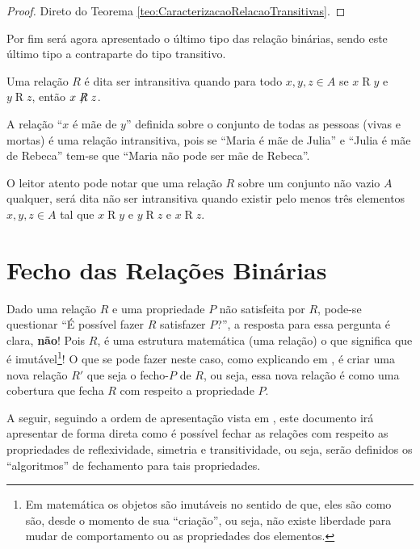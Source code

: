 \begin{proof}
	Direto do Teorema \ref{teo:CaracterizacaoRelacaoTransitivas}.
\end{proof}

Por fim será agora apresentado o último tipo das relação binárias, sendo este último tipo a contraparte do tipo transitivo.

\begin{definicao}\label{def::RelacaoIntransitiva}
	Uma relação $R$ é dita ser intransitiva quando para todo $x, y, z \in A$ se $x \mathrel{R} y$ e $y \mathrel{R} z$, então $x \centernot{R} z$.
\end{definicao}

\begin{exemplo}
	A relação ``$x$ é mãe de $y$'' definida sobre o conjunto de todas as pessoas (vivas e mortas) é uma relação intransitiva, pois se ``Maria é mãe de Julia'' e ``Julia é mãe de Rebeca'' tem-se que ``Maria não pode ser mãe de Rebeca''.
\end{exemplo}

O leitor atento pode notar que uma relação $R$ sobre um conjunto não vazio $A$ qualquer, será dita não ser intransitiva quando existir pelo menos três elementos $x, y, z \in A$ tal que $x \mathrel{R} y$ e $y \mathrel{R} z$ e $x \mathrel{R} z$.

\section{Fecho das Relações Binárias}\label{sec:FechoDasRelacoesBinarias}

Dado uma relação $R$ e uma propriedade $P$ não satisfeita por $R$,  pode-se questionar ``É possível fazer $R$ satisfazer  $P$?'', a resposta para essa pergunta é clara, \textbf{não}! Pois $R$, é uma estrutura matemática (uma relação) o que significa que é imutável\footnote{Em matemática os objetos são imutáveis no sentido de que, eles são como são, desde o momento de sua ``criação'', ou seja, não existe liberdade para mudar de comportamento ou as propriedades dos elementos.}! O que se pode fazer neste caso, como explicando em \cite{judith2021}, é criar uma nova relação $R'$ que seja o fecho-$P$ de $R$, ou seja, essa nova relação é como uma cobertura que fecha $R$ com respeito a propriedade $P$. 

A seguir, seguindo a ordem de apresentação vista em \cite{Gerard2021discreta}, este documento irá apresentar de forma direta como é possível fechar as relações com respeito as propriedades de reflexividade, simetria e transitividade, ou seja, serão definidos os ``algoritmos'' de fechamento para tais propriedades.

